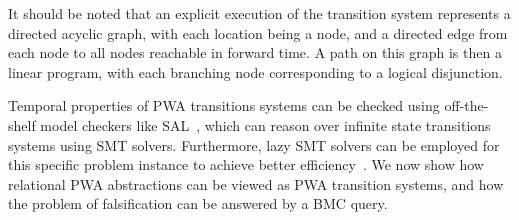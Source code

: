 It should be noted that an explicit execution of the transition system
represents a directed acyclic graph, with each location being a node,
and a directed edge from each node to all nodes reachable in forward
time. A path on this graph is then a linear program, with each
branching node corresponding to a logical disjunction.

Temporal properties of PWA transitions systems can be checked using
off-the-shelf model checkers like SAL~\cite{SAL-SRI}, which can reason
over infinite state transitions systems using SMT solvers.
Furthermore, lazy SMT solvers can be employed for this specific
problem instance to achieve better efficiency~\cite{shoukry2017smc}.
We now show how relational PWA abstractions can be viewed as PWA
transition systems, and how the problem of falsification can
be answered by a BMC query.


%    
